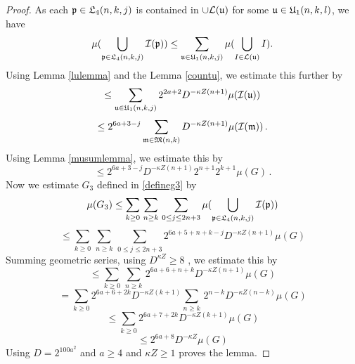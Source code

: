     \begin{proof}
As each $\fp\in \fL_4(n,k,j)$
is contained in $\cup\mathcal{L}(\fu)$ for some
$\fu\in \fU_1(n,k,l)$, we have
\begin{equation}
\mu(\bigcup_{\fp \in \fL_4 (n,k,j)}\sc(\fp))
\le \sum_{\fu\in \fU_1(n,k,j)}
\mu(\bigcup_{I \in \mathcal{L} (\fu)}I).
\end{equation}
Using Lemma \ref{lulemma} and the Lemma \ref{countu}, we estimate this further
 by
\begin{equation}
    \le \sum_{\fu\in \fU_1(n,k,j)}
    2^{2a+2} D^{-\kappa Z(n+1)}
        \mu(\sc(\mathfrak{u}))
\end{equation}
\begin{equation}
    \le 2^{6a+3-j} \sum_{\mathfrak{m}\in \mathfrak{M}(n,k)}
     D^{-\kappa Z(n+1)}
    \mu(\sc(\mathfrak{m}))\,.
\end{equation}
Using Lemma \ref{musumlemma}, we estimate this by
  \begin{equation}
     \le
2^{6a + 3-j}  D^{-\kappa Z(n+1)}
     2^{n+1}2^{k+1}\mu(G)\, .
\end{equation}
Now we estimate $G_3$ defined in \eqref{defineg3} by
\begin{equation}
    \mu(G_3)\le \sum_{k\ge 0}\, \sum_{n \geq k}\,
    \sum_{0\le j\le 2n+3}
    \mu(\bigcup_{\fp \in \fL_4 (n,k,j)}
    \sc(\fp))
\end{equation}
\begin{equation}
    \le \sum_{k\ge 0}\, \sum_{n \geq k}\,
    \sum_{0\le j\le 2n+3}
    2^{6a + 5 + n + k -j}  D^{-\kappa Z(n+1)}\mu(G)
\end{equation}
Summing geometric series, using $D^{\kappa Z}\ge 8$ , we estimate this by
\begin{equation}
    \le \sum_{k\ge 0}\, \sum_{n \geq k}\,
    2^{6a + 6 + n + k}  D^{-\kappa Z(n+1)}\mu(G)
\end{equation}
\begin{equation}
    = \sum_{k\ge 0} 2^{6a + 6 + 2k} D^{-\kappa Z(k+1)} \sum_{n \geq k}\,
    2^{n - k}  D^{-\kappa Z(n-k)}\mu(G)
\end{equation}
\begin{equation}
    \le \sum_{k\ge 0} 2^{6a + 7 + 2k}  D^{-\kappa Z(k+1)}\mu(G)
\end{equation}
\begin{equation}
   \le 2^{6a + 8}  D^{-\kappa Z}\mu(G)
\end{equation}
Using $D = 2^{100a^2}$ and $a \ge 4$ and $\kappa Z \ge 1$ proves the lemma.
\end{proof}

